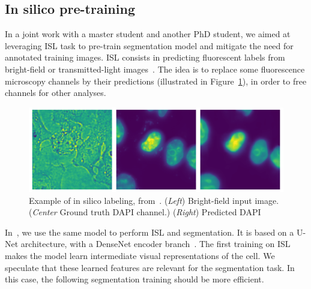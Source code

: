 
\subsection{In silico pre-training}
\label{subsec:segmentation_insilico}

In a joint work with a master student and another PhD student, we aimed at leveraging \ac{ISL} task to pre-train segmentation model and mitigate the need for annotated training images.
\ac{ISL} consists in predicting fluorescent labels from bright-field or transmitted-light images~\cite{christiansen_silico_2018, ounkomol_label_free_2018}. The idea is to replace some fluorescence microscopy channels by their predictions (illustrated in Figure~\ref{fig:example_insilico}), in order to free channels for other analyses. 

\begin{figure}[]
    \centering
    \includegraphics[width=\textwidth]{figures/chapter3/insilico_prediction}
    \caption[Example of in silico labeling]{Example of in silico labeling, from~\cite{Bonte_2022}.
	(\textit{Left}) Bright-field input image.
	(\textit{Center} Ground truth DAPI channel.)
	(\textit{Right}) Predicted DAPI}
    \label{fig:example_insilico}
\end{figure}

In~\cite{Bonte_2022}, we use the same model to perform \ac{ISL} and segmentation.
It is based on a U-Net architecture, with a DenseNet encoder branch~\cite{Huang_2017_CVPR}.
The first training on \ac{ISL} makes the model learn intermediate visual representations of the cell.
We speculate that these learned features are relevant for the segmentation task.
In this case, the following segmentation training should be more efficient.

